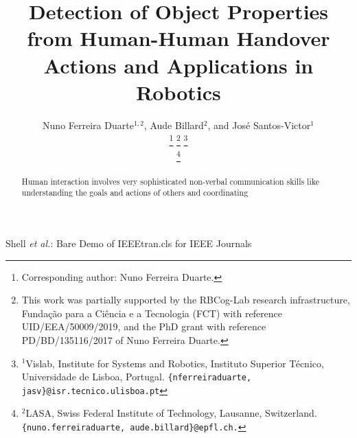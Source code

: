 \documentclass[journal]{IEEEtran}
\begin{document}
%

\title{Detection of Object Properties from Human-Human Handover Actions and Applications in Robotics}
%
\author{Nuno Ferreira Duarte$^{1,2}$, 
        Aude Billard$^2$, and 
        Jos\'{e} Santos-Victor$^{1}$ 
        
\thanks{Corresponding author: Nuno Ferreira Duarte.}
\thanks{This work was partially supported by the RBCog-Lab research infrastructure, Funda\c{c}\~{a}o para a Ci\^{e}ncia e a Tecnologia (FCT) with reference UID/EEA/50009/2019, and the PhD grant with reference PD/BD/135116/2017 of Nuno Ferreira Duarte.}
\thanks{$^{1}$Vislab, Institute for Systems and Robotics, Instituto Superior T\'{e}cnico, Universidade de Lisboa, Portugal.
{\tt\{nferreiraduarte, jasv\}@isr.tecnico.ulisboa.pt}}

\thanks{$^2$LASA, Swiss Federal Institute of Technology, Lausanne, Switzerland. {\tt \{nuno.ferreiraduarte, aude.billard\}@epfl.ch.}}
}

%
{Shell \MakeLowercase{\textit{et al.}}: Bare Demo of IEEEtran.cls for IEEE Journals}
% 






\maketitle

\begin{abstract}
Human interaction involves very sophisticated non-verbal communication skills like understanding the goals and actions of others and coordinating 

\end{abstract}

\end{document}
